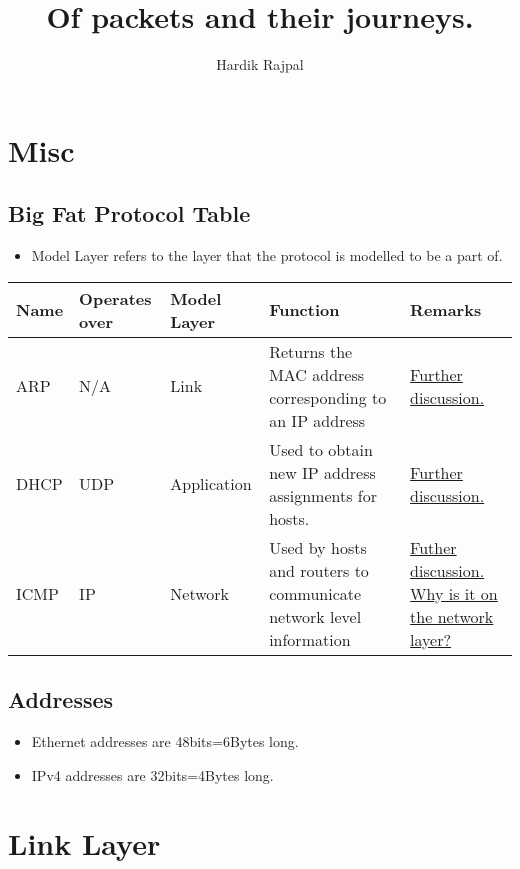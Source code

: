 \documentclass{report}
\author{Hardik Rajpal}
\title{Of packets and their journeys.}
\newcommand{\protorow}[5]{#1 & #2 & #3 & #4 & #5\\ \hline}
\begin{document}
\maketitle
\tableofcontents
\chapter{Misc}
\section{Big Fat Protocol Table}
\begin{itemize}
\item Model Layer refers to the layer that the protocol is modelled to be a part of.
\end{itemize}
\begin{center}
\begin{tabular}{| p{1cm} | p{2cm} | p{2.5cm} | p{5cm} | p{4cm} | }
\hline
\protorow{Name}{Operates over}{Model Layer}{Function}{Remarks}
\protorow{ARP}{N/A}{Link}{Returns the MAC address corresponding to an IP address}{\hyperref[sec:arp]{Further discussion.}}
\protorow{DHCP}{UDP}{Application}{Used to obtain new IP address assignments for hosts.}{\hyperref[sec:dhcp]{Further discussion.}}
\protorow{ICMP}{IP}{Network}{Used by hosts and routers to communicate network level information}{\hyperref[sec:icmp]{Futher discussion.} \href{https://serverfault.com/questions/511965/why-is-icmp-categorized-as-a-layer-3-protocol}{Why is it on the network layer?}}
\end{tabular}
\end{center}
\section{Addresses}
\begin{itemize}
\item Ethernet addresses are 48bits=6Bytes long.
\item IPv4 addresses are 32bits=4Bytes long.
\end{itemize}
\chapter{Link Layer}
\end{document}

